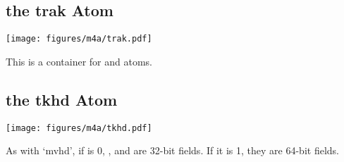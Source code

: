 \subsection{the trak Atom}
\label{atom:trak}
\begin{minipage}[t]{4.75in}
\texttt{[image: figures/m4a/trak.pdf]}
\par
\noindent
This is a container for \hyperref[atom:tkhd]{} and
\hyperref[atom:mdia]{} atoms.
\noindent
\subsection{the tkhd Atom}
\label{atom:tkhd}
\texttt{[image: figures/m4a/tkhd.pdf]}
\par
\noindent
As with `mvhd', if  is 0, ,
 and  are 32-bit fields.
If it is 1, they are 64-bit fields.
\end{minipage}

\clearpage

